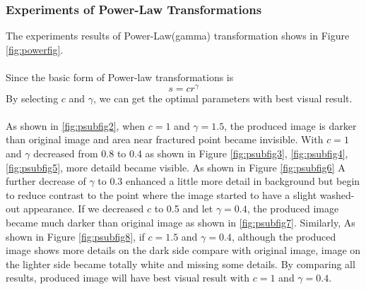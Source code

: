 \subsubsection{Experiments of Power-Law Transformations}
The experiments results of Power-Law(gamma) transformation shows in Figure \ref{fig:powerfig}.\\
\\
Since the basic form of Power-law transformations is
$$ s = cr^{\gamma} $$
By selecting $c$ and $\gamma$, we can get the optimal parameters with best visual result.\\
\\
As shown in \ref{fig:psubfig2}, when $c = 1$ and $\gamma=1.5$, the produced image is darker than original image and area near fractured point became invisible. With $ c = 1$ and $\gamma$ decreased from 0.8 to 0.4 as shown in Figure \ref{fig:psubfig3}, \ref{fig:psubfig4}, \ref{fig:psubfig5}, more detaild became visible. As shown in Figure \ref{fig:psubfig6} A further decrease of $\gamma$ to 0.3 enhanced a little more detail in background but begin to reduce contrast to the point where the image started to have a slight washed-out appearance. If we decreased $c$ to 0.5 and let $\gamma = 0.4$, the produced image became much darker than original image as shown in \ref{fig:psubfig7}. Similarly, As shown in Figure \ref{fig:psubfig8}, if $c = 1.5$ and $\gamma = 0.4$, although the produced image shows more details on the dark side compare with original image, image on the lighter side became totally white and missing some details. By comparing all results, produced image will have best visual result with $c = 1$ and $\gamma = 0.4$. 

